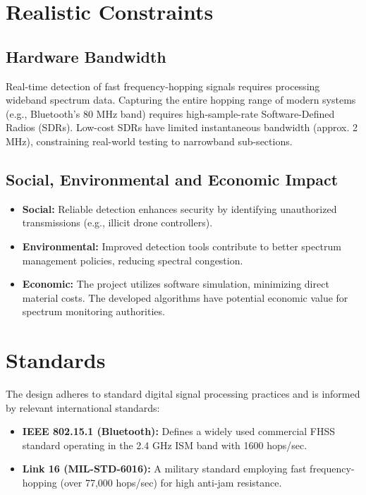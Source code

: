 \documentclass[12pt,a4paper]{report}
\theoremstyle{plain}
\begin{document}
\section{Realistic Constraints}
\subsection{Hardware Bandwidth}
Real-time detection of fast frequency-hopping signals requires processing wideband spectrum data. Capturing the entire hopping range of modern systems (e.g., Bluetooth's 80 MHz band) requires high-sample-rate Software-Defined Radios (SDRs). Low-cost SDRs have limited instantaneous bandwidth (approx. 2 MHz), constraining real-world testing to narrowband sub-sections.

\subsection{Social, Environmental and Economic Impact}
\begin{itemize}
    \item \textbf{Social:} Reliable detection enhances security by identifying unauthorized transmissions (e.g., illicit drone controllers).
    \item \textbf{Environmental:} Improved detection tools contribute to better spectrum management policies, reducing spectral congestion.
    \item \textbf{Economic:} The project utilizes software simulation, minimizing direct material costs. The developed algorithms have potential economic value for spectrum monitoring authorities.
\end{itemize}

\section{Standards}
The design adheres to standard digital signal processing practices and is informed by relevant international standards:
\begin{itemize}
    \item \textbf{IEEE 802.15.1 (Bluetooth):} Defines a widely used commercial FHSS standard operating in the 2.4 GHz ISM band with 1600 hops/sec.
    \item \textbf{Link 16 (MIL-STD-6016):} A military standard employing fast frequency-hopping (over 77,000 hops/sec) for high anti-jam resistance.
\end{itemize}
\end{document}
